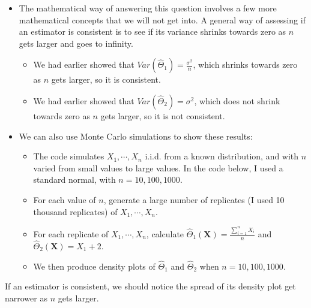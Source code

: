 \documentclass[
]{book}
\providecommand{\tightlist}{%
  \setlength{\itemsep}{0pt}\setlength{\parskip}{0pt}}
\begin{document}
\begin{itemize}
\item
  The mathematical way of answering this question involves a few more mathematical concepts that we will not get into. A general way of assessing if an estimator is consistent is to see if its variance shrinks towards zero as \(n\) gets larger and goes to infinity.

  \begin{itemize}
  \item
    We had earlier showed that \(Var(\hat{\Theta}_1) = \frac{\sigma^2}{n}\), which shrinks towards zero as \(n\) gets larger, so it is consistent.
  \item
    We had earlier showed that \(Var(\hat{\Theta}_2) = \sigma^2\), which does not shrink towards zero as \(n\) gets larger, so it is not consistent.
  \end{itemize}
\item
  We can also use Monte Carlo simulations to show these results:

  \begin{itemize}
  \tightlist
  \item
    The code simulates \(X_1, \cdots, X_{n}\) i.i.d. from a known distribution, and with \(n\) varied from small values to large values. In the code below, I used a standard normal, with \(n=10, 100, 1000\).\\
  \item
    For each value of \(n\), generate a large number of replicates (I used 10 thousand replicates) of \(X_1, \cdots, X_{n}\).
  \item
    For each replicate of \(X_1, \cdots, X_{n}\), calculate \(\hat{\Theta}_1(\boldsymbol{X}) = \frac{\sum_{i=1}^n X_i}{n}\) and \(\hat{\Theta}_2(\boldsymbol{X}) = X_1 + 2\).
  \item
    We then produce density plots of \(\hat{\Theta}_1\) and \(\hat{\Theta}_2\) when \(n=10, 100, 1000\).
  \end{itemize}
\end{itemize}

If an estimator is consistent, we should notice the spread of its density plot get narrower as \(n\) gets larger.
\end{document}
